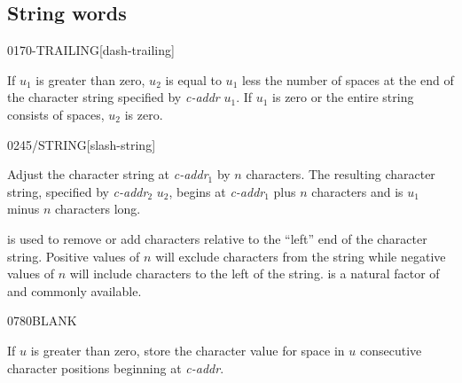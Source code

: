 \subsection{String words} %


\begin{newword}{0170}{-TRAILING}[dash-trailing]

	If $u_1$ is greater than zero, $u_2$ is equal to $u_1$ less the
	number of spaces at the end of the character string specified by
	\emph{c-addr} $u_1$. If $u_1$ is zero or the entire string
	consists of spaces, $u_2$ is zero.
\end{newword}


\begin{newword}{0245}{/STRING}[slash-string]

	Adjust the character string at \emph{c-addr}$_1$ by $n$
	characters. The resulting character string, specified by
	\emph{c-addr}$_2$ $u_2$, begins at \emph{c-addr}$_1$ plus $n$
	characters and is $u_1$ minus $n$ characters long.

	\begin{rationale}
		 is used to remove or add characters relative
		to the ``left'' end of the character string. Positive values
		of $n$ will exclude characters from the string while negative
		values of $n$ will include characters to the left of the
		string.  is a natural factor of 
		and commonly available.
	\end{rationale}
\end{newword}


\begin{newword}{0780}{BLANK}

	If $u$ is greater than zero, store the character value for
	space in $u$ consecutive character positions beginning at
	\emph{c-addr}.
\end{newword}


